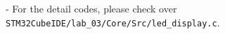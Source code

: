 - For the detail codes, please check over \texttt{STM32CubeIDE/lab\_03/Core/Src/led\_display.c}.





















































